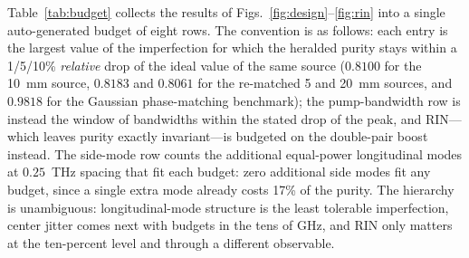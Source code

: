Table~\ref{tab:budget} collects the results of
Figs.~\ref{fig:design}--\ref{fig:rin} into a single auto-generated
budget of eight rows. The convention is as follows: each entry is the
largest value of the imperfection for which the heralded purity stays
within a 1/5/10\% \emph{relative} drop of the ideal value of the same
source ($0.8100$ for the 10~mm source, $0.8183$ and $0.8061$ for the
re-matched 5 and 20~mm sources, and $0.9818$ for the Gaussian
phase-matching benchmark); the pump-bandwidth row is instead the
window of bandwidths within the stated drop of the peak, and
RIN---which leaves purity exactly invariant---is budgeted on the
double-pair boost instead. The side-mode row counts the additional
equal-power longitudinal modes at $0.25$~THz spacing that fit each
budget: zero additional side modes fit any budget, since a single
extra mode already costs 17\% of the purity. The hierarchy is
unambiguous: longitudinal-mode structure is the least tolerable
imperfection, center jitter comes next with budgets in the tens of
GHz, and RIN only matters at the ten-percent level and through a
different observable.

\begin{table}[t]
\centering

\caption{Imperfection budget, auto-generated from the sweeps of
Sec.~\ref{sec:results}. Each entry is the largest imperfection keeping
the heralded purity within the stated relative drop of the ideal value
of the same source. Monte-Carlo cells are quoted as the mean $\pm$ SEM
of the per-seed threshold crossings ($S = 16$ seeds; $S = 8$ for the
RIN row); a cell is quoted only when every seed crosses inside the
sweep, the confidence interval clears the zero-effect point, and the
purity drop is resolved at $2\sigma$---otherwise a one-sided bound
would be shown instead. Deterministic rows (pump bandwidth) carry no
Monte-Carlo error. The bandwidth row gives the tolerance window
around the purity peak, and RIN is budgeted on the double-pair boost
$\langle w^2 \rangle / \langle w \rangle^2$ because the purity is
exactly RIN-invariant.}
\label{tab:budget}
\end{table}
